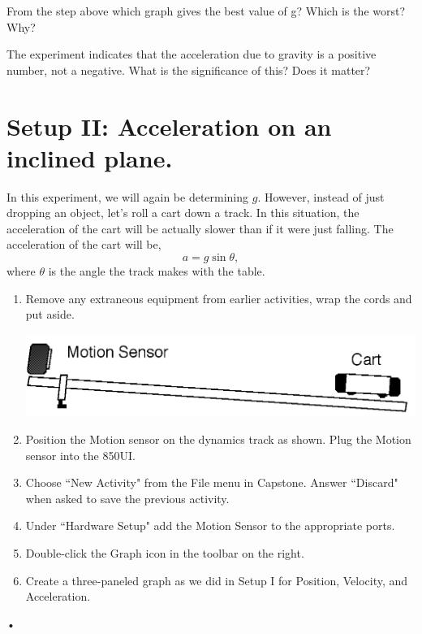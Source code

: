 \documentclass[main.tex]{subfiles}
\begin{document}
\begin{question}
From the step above which graph gives the best value of g? Which is the worst? Why?
\end{question}
\begin{question}
The experiment indicates that the acceleration due to gravity is a positive number, not a negative. What is the significance of this? Does it matter?
\end{question}

\section{Setup II: Acceleration on an inclined plane.}
In this experiment, we will again be determining $g.$ However, instead of just dropping an object, let's roll a cart down a track. In this situation, the acceleration of the cart will be actually slower than if it were just falling. The acceleration of the cart will be,
\begin{equation}\label{eq:AsinG}
a=g\sin{\theta},
\end{equation}
where $\theta$ is the angle the track makes with the table. 

\begin{enumerate}
\item
Remove any extraneous equipment from earlier activities, wrap the cords and put aside.

\includegraphics[width=\textwidth]{Accel_2_Setup}
\item
Position the Motion sensor on the dynamics track as shown. Plug the Motion sensor into the 850UI.
\item
Choose ``New Activity" from the File menu in Capstone. Answer ``Discard" when asked to save the previous activity.
\item
Under ``Hardware Setup" add the Motion Sensor to the appropriate ports.
\item
Double-click the Graph icon in the toolbar on the right.
\item
Create a three-paneled graph as we did in Setup I for Position, Velocity, and Acceleration. 
\end{enumerate}•
\end{document}
